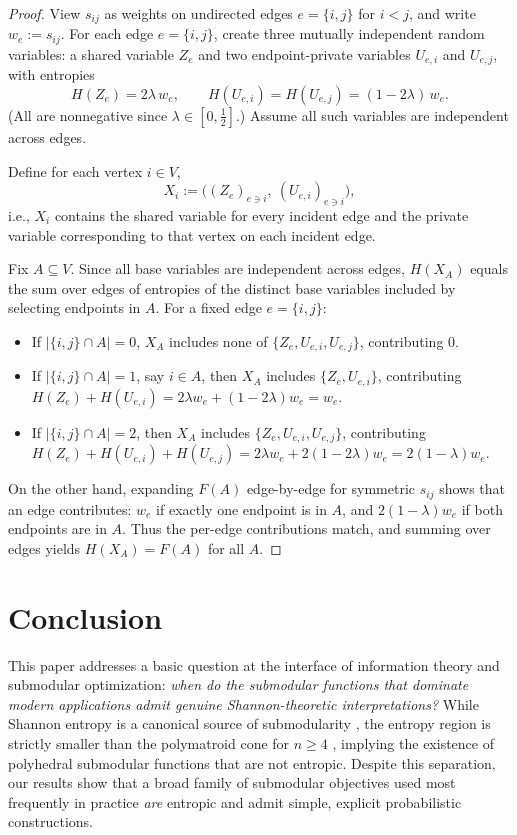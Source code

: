 \documentclass[conference]{IEEEtran}
\theoremstyle{definition}
\theoremstyle{remark}
\begin{document}
\begin{proof}
View $s_{ij}$ as weights on undirected edges $e=\{i,j\}$ for $i<j$, and write $w_e:=s_{ij}$.
For each edge $e=\{i,j\}$, create three mutually independent random variables:
a shared variable $Z_e$ and two endpoint-private variables $U_{e,i}$ and $U_{e,j}$, with entropies
\[
H(Z_e)=2\lambda\,w_e,\qquad H(U_{e,i})=H(U_{e,j})=(1-2\lambda)\,w_e.
\]
(All are nonnegative since $\lambda\in[0,\tfrac12]$.) Assume all such variables are independent across edges.

Define for each vertex $i\in V$,
\[
X_i := \Big((Z_e)_{e\ni i},\ (U_{e,i})_{e\ni i}\Big),
\]
i.e., $X_i$ contains the shared variable for every incident edge and the private variable corresponding
to that vertex on each incident edge.

Fix $A\subseteq V$. Since all base variables are independent across edges, $H(X_A)$ equals the sum over edges
of entropies of the distinct base variables included by selecting endpoints in $A$. For a fixed edge $e=\{i,j\}$:

\begin{itemize}
\item If $|\{i,j\}\cap A|=0$, $X_A$ includes none of $\{Z_e,U_{e,i},U_{e,j}\}$, contributing $0$.
\item If $|\{i,j\}\cap A|=1$, say $i\in A$, then $X_A$ includes $\{Z_e,U_{e,i}\}$, contributing
$H(Z_e)+H(U_{e,i})=2\lambda w_e+(1-2\lambda)w_e=w_e$.
\item If $|\{i,j\}\cap A|=2$, then $X_A$ includes $\{Z_e,U_{e,i},U_{e,j}\}$, contributing
$H(Z_e)+H(U_{e,i})+H(U_{e,j})=2\lambda w_e+2(1-2\lambda)w_e=2(1-\lambda)w_e$.
\end{itemize}

On the other hand, expanding $F(A)$ edge-by-edge for symmetric $s_{ij}$ shows that an edge contributes:
$w_e$ if exactly one endpoint is in $A$, and $2(1-\lambda)w_e$ if both endpoints are in $A$.
Thus the per-edge contributions match, and summing over edges yields $H(X_A)=F(A)$ for all $A$.
\end{proof}


\section{Conclusion}
This paper addresses a basic question at the interface of information theory and submodular optimization: \emph{when do the submodular functions that dominate modern applications admit genuine Shannon-theoretic interpretations?}
While Shannon entropy is a canonical source of submodularity \cite{Shannon1948,Yeung2008}, the entropy region is strictly smaller than the polymatroid cone for $n\ge 4$ \cite{ZhangYeung1997,ZhangYeung1998,DoughertyFreilingZeger2011,Matus2013AlmostEntropic}, implying the existence of polyhedral submodular functions that are not entropic.
Despite this separation, our results show that a broad family of submodular objectives used most frequently in practice \emph{are} entropic and admit simple, explicit probabilistic constructions.
\end{document}
